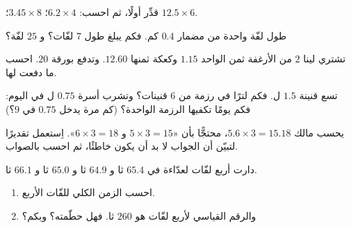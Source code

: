 \begin{exercise}[$\star$]\label{exo:g5:decimalops:6}
قدِّر أولًا، ثم احسب: $6.2 \times 4$؛ \quad
$3.45 \times 8$؛ \quad $12.5 \times 6$.
\end{exercise}

\begin{exercise}[$\star$]\label{exo:g5:decimalops:7}
طول لفّة واحدة من مضمار $0.4$ كم. فكم يبلغ طول $7$ لفّات؟ و
$25$ لفّة؟
\end{exercise}

\begin{exercise}[$\star$]\label{exo:g5:decimalops:8}
تشتري لينا $2$ من الأرغفة ثمن الواحد $1.15$ وكعكة ثمنها $12.60$.
وتدفع بورقة $20$. احسب  ما دفعت  لها.
\end{exercise}

\begin{exercise}[$\star$]\label{exo:g5:decimalops:9}
تسع قنينة $1.5$ ل. فكم لترًا في رزمة من $6$ قنينات؟
وتشرب أسرة $0.75$ ل في اليوم: فكم يومًا تكفيها الرزمة
الواحدة؟ (كم مرة يدخل $0.75$ في $9$؟)
\end{exercise}

\begin{exercise}[$\star\star$]\label{exo:g5:decimalops:10}
يحسب مالك $5.6 \times 3 = 15.18$، محتجًّا بأن «$5 \times 3 = 15$
و $6 \times 3 = 18$». اِستعمل تقديرًا لتبيّن أن الجواب لا بد أن
يكون خاطئًا، ثم احسب بالصواب.
\end{exercise}

\begin{exercise}[$\star\star$]\label{exo:g5:decimalops:11}
دارت أربع لفّات لعدّاءة في $65.4$ ثا و $64.9$ ثا و $65.0$ ثا و
$66.1$ ثا.
\begin{enumerate}
  \item احسب الزمن الكلي للفّات الأربع.
  \item والرقم القياسي لأربع لفّات هو $260$ ثا. فهل حطّمته؟
        وبكم؟
\end{enumerate}
\end{exercise}
